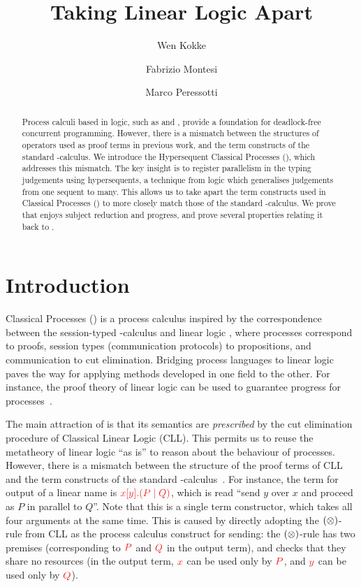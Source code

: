 \documentclass[draft,submission,copyright,creativecommons]{eptcs}
\title{Taking Linear Logic Apart}
\author{%
  Wen Kokke
  \institute{University of Edinburgh\\ Edinburgh, Scotland}
  \email{wen.kokke@ed.ac.uk}
  \and
  Fabrizio Montesi
  \institute{University of Southern Denmark\\ Odense, Denmark}
  \email{fmontesi@imada.sdu.dk}
  \and
  Marco Peressotti
  \institute{University of Southern Denmark\\ Odense, Denmark}
  \email{peressotti@imada.sdu.dk}}
\begin{document}
\maketitle

\begin{abstract}
  Process calculi based in logic, such as \piDILL and \cp, provide a foundation
  for deadlock-free concurrent programming.
  However, there is a mismatch between the structures of operators used as proof
  terms in previous work, and the term constructs of the standard \textpi-calculus.
  We introduce the Hypersequent Classical Processes (\hcp), which addresses this
  mismatch.
  The key insight is to register parallelism in the typing judgements using
  hypersequents, a technique from logic which generalises judgements from one
  sequent to many.
  This allows us to take apart the term constructs used in Classical Processes
  (\cp) to more closely match those of the standard \textpi-calculus.
  We prove that \hcp enjoys subject reduction and progress, and prove several
  properties relating it back to \cp.
\end{abstract}

\section{Introduction}
\label{sec:introduction}

Classical Processes (\cp) \cite{wadler2012} is a process calculus inspired by the
correspondence between the session-typed \textpi-calculus and linear logic
\cite{caires2010}, where processes correspond to proofs, session types
(communication protocols) to propositions, and communication to cut elimination.
Bridging process languages to linear logic paves the way for applying methods
developed in one field to the other.
For instance, the proof theory of linear logic can be used to guarantee progress
for processes~\cite{caires2010,wadler2012}.

The main attraction of \cp is that its semantics are \emph{prescribed} by the
cut elimination procedure of Classical Linear Logic (CLL).
This permits us to reuse the metatheory of linear logic ``as is'' to reason about
the behaviour of processes.
However, there is a mismatch between the structure of the proof terms of CLL and
the term constructs of the standard \textpi-calculus~\cite{milner1992a,milner1992b}.
For instance, the term for output of a linear name is
$\tm{\cpSend{x}{y}{P}{Q}}$, which is read ``send $y$ over $x$ and proceed as $P$
in parallel to $Q$''.
Note that this is a single term constructor, which takes all four arguments at
the same time.
This is caused by directly adopting the $(\otimes)$-rule from CLL as the process
calculus construct for sending: the $(\otimes)$-rule has two premises (corresponding to $\tm P$ and $\tm Q$ in the output term), and checks
that they share no resources (in the output term, $\tm x$ can be used only by $\tm P$, and $\tm y$ can be used only by $\tm Q$).
\end{document}
